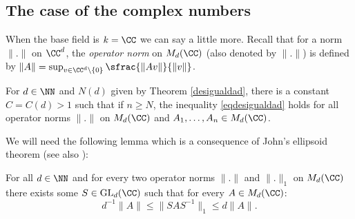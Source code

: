 \subsection{The case of the complex numbers}\label{casoc} When the base field is $k=\CC$ we can say a little more. Recall that for a norm $\|.\|$ on $\CC^{d}$, the \textit{operator norm} on $M_{d}(\CC)$ (also denoted by $\|.\|$) is defined by $\|A\|=\sup_{v\in \CC^{d}\backslash \{ 0\}}{\sfrac{\|Av\|}{\|v\|}}$.
\begin{prop}\label{independ} For $d\in \NN$ and $N(d)$ given by Theorem \ref{desigualdad}, there is a constant $C=C(d)>1$ such that if $n\geq N$, the inequality \eqref{eqdesigualdad} holds for all operator norms $\|.\|$ on $M_{d}(\CC)$ and $A_1,\dots,A_n\in M_{d}(\CC)$.
\end{prop}
We will need the following lemma which is a consequence of John's ellipsoid theorem \cite[Th.\,10.12.2]{schr} (see also \cite[Lem.\,3.2]{bociineq}):
\begin{lema}\label{lemadeljairo}
For all $d\in \NN$ and for every two operator norms $\|.\|$ and $\|.\|_{1}$ on $M_{d}(\CC)$ there exists some $S\in\mathrm{GL}_{d}(\CC)$ such that for every $A \in M_{d}(\CC)$:
\begin{equation*}\label{kk}
d^{-1}\|A\|\leq\|SAS^{-1}\|_{1}\leq d\|A\|.
\end{equation*}
\end{lema}
